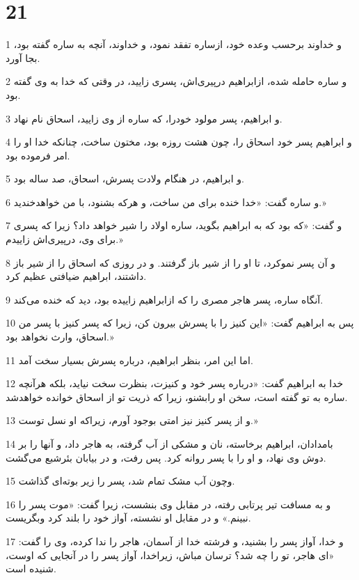 \chapter{21}

\par 1 و خداوند برحسب وعده خود، ازساره تفقد نمود، و خداوند، آنچه به ساره گفته بود، بجا آورد.
\par 2 و ساره حامله شده، ازابراهیم در‌پیری‌اش، پسری زایید، در وقتی که خدا به وی گفته بود.
\par 3 و ابراهیم، پسر مولود خودرا، که ساره از وی زایید، اسحاق نام نهاد.
\par 4 و ابراهیم پسر خود اسحاق را، چون هشت روزه بود، مختون ساخت، چنانکه خدا او را امر فرموده بود.
\par 5 و ابراهیم، در هنگام ولادت پسرش، اسحاق، صد ساله بود.
\par 6 و ساره گفت: «خدا خنده برای من ساخت، و هر‌که بشنود، با من خواهدخندید.»
\par 7 و گفت: «که بود که به ابراهیم بگوید، ساره اولاد را شیر خواهد داد؟ زیرا که پسری برای وی، در‌پیری‌اش زاییدم.»
\par 8 و آن پسر نموکرد، تا او را از شیر باز گرفتند. و در روزی که اسحاق را از شیر باز داشتند، ابراهیم ضیافتی عظیم کرد.
\par 9 آنگاه ساره، پسر هاجر مصری را که ازابراهیم زاییده بود، دید که خنده می‌کند.
\par 10 پس به ابراهیم گفت: «این کنیز را با پسرش بیرون کن، زیرا که پسر کنیز با پسر من اسحاق، وارث نخواهد بود.»
\par 11 اما این امر، بنظر ابراهیم، درباره پسرش بسیار سخت آمد.
\par 12 خدا به ابراهیم گفت: «درباره پسر خود و کنیزت، بنظرت سخت نیاید، بلکه هر‌آنچه ساره به تو گفته است، سخن او رابشنو، زیرا که ذریت تو از اسحاق خوانده خواهدشد.
\par 13 و از پسر کنیز نیز امتی بوجود آورم، زیراکه او نسل توست.»
\par 14 بامدادان، ابراهیم برخاسته، نان و مشکی از آب گرفته، به هاجر داد، و آنها را بر دوش وی نهاد، و او را با پسر روانه کرد. پس رفت، و در بیابان بئرشبع می‌گشت.
\par 15 وچون آب مشک تمام شد، پسر را زیر بوته‌ای گذاشت.
\par 16 و به مسافت تیر پرتابی رفته، در مقابل وی بنشست، زیرا گفت: «موت پسر را نبینم.» و در مقابل او نشسته، آواز خود را بلند کرد وبگریست.
\par 17 و خدا، آواز پسر را بشنید، و فرشته خدا از آسمان، هاجر را ندا کرده، وی را گفت: «ای هاجر، تو را چه شد؟ ترسان مباش، زیراخدا، آواز پسر را در آنجایی که اوست، شنیده است.
